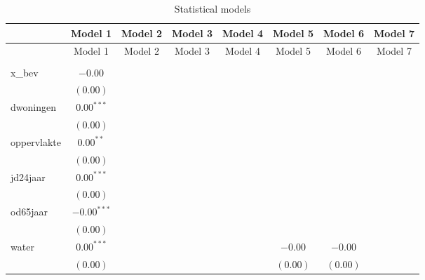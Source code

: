 
\begin{center}
\begin{longtable}{l c c c c c c c }
\hline
 & Model 1 & Model 2 & Model 3 & Model 4 & Model 5 & Model 6 & Model 7 \\
\hline
\endfirsthead
\hline
 & Model 1 & Model 2 & Model 3 & Model 4 & Model 5 & Model 6 & Model 7 \\
\hline
\endhead
\hline
\endfoot
\hline
\multicolumn{8}{l}{\scriptsize{$^{***}p<0.001$, $^{**}p<0.01$, $^*p<0.05$}}\\
\caption{Statistical models}
\label{table:coefficients}
\endlastfoot
x\_bev           & $-0.00$       &              &               &               &               &               &               \\
                 & $(0.00)$      &              &               &               &               &               &               \\
dwoningen        & $0.00^{***}$  &              &               &               &               &               &               \\
                 & $(0.00)$      &              &               &               &               &               &               \\
oppervlakte      & $0.00^{**}$   &              &               &               &               &               &               \\
                 & $(0.00)$      &              &               &               &               &               &               \\
jd24jaar         & $0.00^{***}$  &              &               &               &               &               &               \\
                 & $(0.00)$      &              &               &               &               &               &               \\
od65jaar         & $-0.00^{***}$ &              &               &               &               &               &               \\
                 & $(0.00)$      &              &               &               &               &               &               \\
water            & $0.00^{***}$  &              &               &               & $-0.00$       & $-0.00$       &               \\
                 & $(0.00)$      &              &               &               & $(0.00)$      & $(0.00)$      &               \\

\end{longtable}
\end{center}
